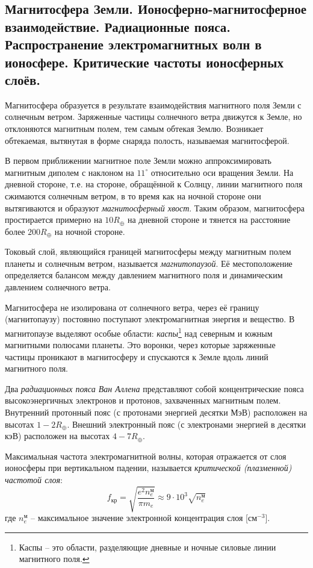 \subsection{Магнитосфера Земли. Ионосферно-магнитосферное взаимодействие. Радиационные пояса. Распространение электромагнитных волн в ионосфере. Критические частоты ионосферных слоёв.}
Магнитосфера образуется в результате взаимодействия магнитного поля Земли с солнечным ветром.
Заряженные частицы солнечного ветра движутся к Земле, но отклоняются магнитным полем, тем самым обтекая Землю.
Возникает обтекаемая, вытянутая в форме снаряда полость, называемая магнитосферой.

В первом приближении магнитное поле Земли можно аппроксимировать магнитным диполем с наклоном на $11^\circ$ относительно оси вращения Земли.
На дневной стороне, т.е. на стороне, обращённой к Солнцу, линии магнитного поля сжимаются солнечным ветром, в то время как на ночной стороне они вытягиваются и образуют \textit{магнитосферный хвост}.
Таким образом, магнитосфера простирается примерно на $10R_\oplus$ на дневной стороне и тянется на расстояние более $200R_\oplus$ на ночной стороне.

Токовый слой, являющийся границей магнитосферы между магнитным полем планеты и солнечным ветром, называется \textit{магнитопаузой}.
Её местоположение определяется балансом между давлением магнитного поля и динамическим давлением солнечного ветра.

Магнитосфера не изолирована от солнечного ветра, через её границу (магнитопаузу) постоянно поступают электромагнитная энергия и вещество.
В магнитопаузе выделяют особые области: \textit{каспы}\footnote{Каспы -- это области, разделяющие дневные и ночные силовые линии магнитного поля.} над северным и южным магнитными полюсами планеты.
Это воронки, через которые заряженные частицы проникают в магнитосферу и спускаются к Земле вдоль линий магнитного поля.

Два \textit{радиационных пояса Ван Аллена} представляют собой концентрические пояса высокоэнергичных электронов и протонов, захваченных магнитным полем.
Внутренний протонный пояс (с протонами энергией десятки МэВ) расположен на высотах $1-2R_\oplus$.
Внешний электронный пояс (с электронами энергией в десятки кэВ) расположен на высотах $4-7R_\oplus$.

Максимальная частота электромагнитной волны, которая отражается от слоя ионосферы при вертикальном падении, называется \textit{критической (плазменной) частотой слоя}:
\begin{equation}
f_\text{кр}=\sqrt{\frac{e^2 n_e^\text{м}}{\pi m_e}}\approx 9\cdot 10^3\sqrt{n_e^\text{м}}
\end{equation}
где $n_e^\text{м}$ -- максимальное значение электронной концентрация слоя [$\text{см}^{-3}$].
